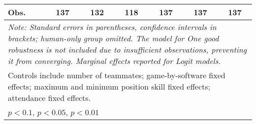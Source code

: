 \begin{tabular}{l*{6}{c}}
Obs.                &137   &132   &118   &137   &137   &137   \\
\hline
\hline\hline
\multicolumn{7}{p{0.8\textwidth}}{\it{Note:} Standard errors in parentheses, confidence intervals in brackets; human-only group omitted. The model for One good robustness is not included due to insufficient observations, preventing it from converging. Marginal effects reported for Logit models.}\\
\multicolumn{7}{l}{Controls include number of teammates; game-by-software fixed effects; maximum and minimum position skill fixed effects; attendance fixed effects.}\\
\multicolumn{7}{l}{\sym{*} \(p<0.1\), \sym{**} \(p<0.05\), \sym{***} \(p<0.01\)}\\
\end{tabular}
